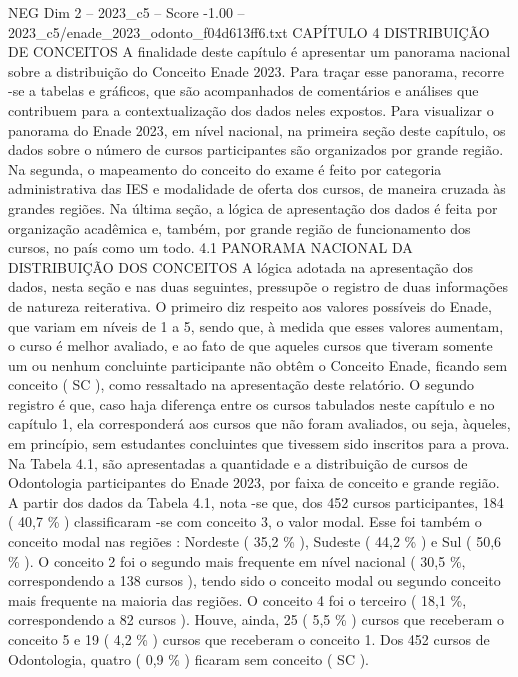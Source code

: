 \begin{textsample}{NEG Dim 2 – 2023\_c5 – Score -1.00 – 2023\_c5/enade\_2023\_odonto\_f04d613ff6.txt}  \label{ex:f2_neg_179}
CAPÍTULO 4 DISTRIBUIÇÃO DE CONCEITOS A finalidade deste capítulo é apresentar um panorama nacional sobre a distribuição do Conceito Enade 2023.
Para traçar esse panorama, recorre -se a tabelas e gráficos, que são acompanhados de comentários e análises que contribuem para a contextualização dos dados neles expostos.
Para visualizar o panorama do Enade 2023, em nível nacional, na primeira seção deste capítulo, os dados sobre o número de cursos participantes são organizados por grande região.
Na segunda, o mapeamento do conceito do exame é feito por categoria administrativa das IES e modalidade de oferta dos cursos, de maneira cruzada às grandes regiões.
Na última seção, a lógica de apresentação dos dados é feita por organização acadêmica e, também, por grande região de funcionamento dos cursos, no país como um todo. 4.1 PANORAMA NACIONAL DA DISTRIBUIÇÃO DOS CONCEITOS A lógica adotada na apresentação dos dados, nesta seção e nas duas seguintes, pressupõe o registro de duas informações de natureza reiterativa.
O primeiro diz respeito aos valores possíveis do Enade, que variam em níveis de 1 a 5, sendo que, à medida que esses valores aumentam, o curso é melhor avaliado, e ao fato de que aqueles cursos que tiveram somente um ou nenhum concluinte participante não obtêm o Conceito Enade, ficando sem conceito ( SC ), como ressaltado na apresentação deste relatório.
O segundo registro é que, caso haja diferença entre os cursos tabulados neste capítulo e no capítulo 1, ela corresponderá aos cursos que não foram avaliados, ou seja, àqueles, em princípio, sem estudantes concluintes que tivessem sido inscritos para a prova.
Na Tabela 4.1, são apresentadas a quantidade e a distribuição de cursos de Odontologia participantes do Enade 2023, por faixa de conceito e grande região.
A partir dos dados da Tabela 4.1, nota -se que, dos 452 cursos participantes, 184 ( 40,7 \% ) classificaram -se com conceito 3, o valor modal.
Esse foi também o conceito modal nas regiões : Nordeste ( 35,2 \% ), Sudeste ( 44,2 \% ) e Sul ( 50,6 \% ).
O conceito 2 foi o segundo mais frequente em nível nacional ( 30,5 \%, correspondendo a 138 cursos ), tendo sido o conceito modal ou segundo conceito mais frequente na maioria das regiões.
O conceito 4 foi o terceiro ( 18,1 \%, correspondendo a 82 cursos ).
Houve, ainda, 25 ( 5,5 \% ) cursos que receberam o conceito 5 e 19 ( 4,2 \% ) cursos que receberam o conceito 1.
Dos 452 cursos de Odontologia, quatro ( 0,9 \% ) ficaram sem conceito ( SC ).

\end{textsample}
